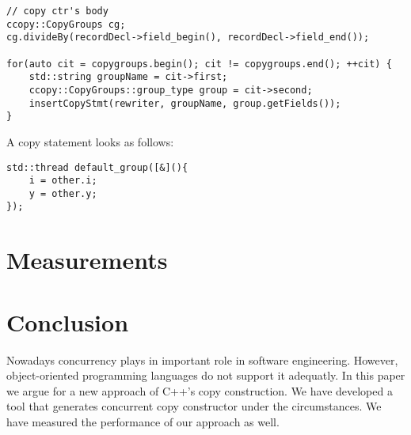 \documentclass{article}
\begin{document}
\begin{verbatim}
// copy ctr's body
ccopy::CopyGroups cg;
cg.divideBy(recordDecl->field_begin(), recordDecl->field_end());

for(auto cit = copygroups.begin(); cit != copygroups.end(); ++cit) {
    std::string groupName = cit->first;
    ccopy::CopyGroups::group_type group = cit->second;
    insertCopyStmt(rewriter, groupName, group.getFields());
}
\end{verbatim}
A copy statement looks as follows:
\begin{verbatim}
std::thread default_group([&](){
    i = other.i;
    y = other.y;
});
\end{verbatim}

\section{Measurements}
\label{measurements}

\section{Conclusion}
\label{conc}

Nowadays concurrency plays in important role in software engineering. However,
object-oriented programming languages do not support it adequatly. In this
paper we argue for a new approach of C++'s copy construction. We have developed
a tool that generates concurrent copy constructor under the circumstances. We
have measured the performance of our approach as well.
\end{document}
